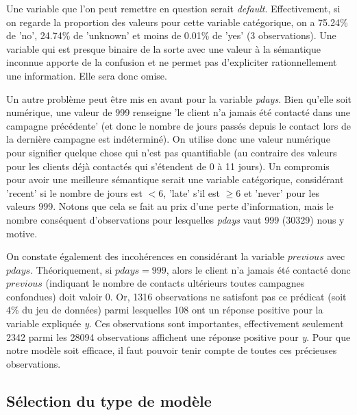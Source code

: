 \documentclass[]{article}
\begin{document}
Une variable que l'on peut remettre en question serait \textit{default}. Effectivement, si on regarde la proportion des valeurs pour cette variable catégorique, on a 75.24\% de 'no', 24.74\% de 'unknown' et moins de 0.01\% de 'yes' (3 observations). Une variable qui est presque binaire de la sorte avec une valeur à la sémantique inconnue apporte de la confusion et ne permet pas d'expliciter rationnellement une information. Elle sera donc omise.\\

\par Un autre problème peut être mis en avant pour la variable \textit{pdays}. Bien qu'elle soit numérique, une valeur de 999 renseigne 'le client n'a jamais été contacté dans une campagne précédente' (et donc le nombre de jours passés depuis le contact lors de la dernière campagne est indéterminé). On utilise donc une valeur numérique pour signifier quelque chose qui n'est pas quantifiable (au contraire des valeurs pour les clients déjà contactés qui s'étendent de 0 à 11 jours). Un compromis pour avoir une meilleure sémantique serait une variable catégorique, considérant 'recent' si le nombre de jours est $<6$, 'late' s'il est $\geq 6$ et 'never' pour les valeurs 999. Notons que cela se fait au prix d'une perte d'information, mais le nombre conséquent d'observations pour lesquelles \textit{pdays} vaut 999 (30329) nous y motive.\\

\par On constate également des incohérences en considérant la variable $previous$ avec $pdays$. Théoriquement, si $pdays=999$, alors le client n'a jamais été contacté donc $previous$ (indiquant le nombre de contacts ultérieurs toutes campagnes confondues) doit valoir 0. Or, 1316 observations ne satisfont pas ce prédicat (soit 4\% du jeu de données) parmi lesquelles 108 ont un réponse positive pour la variable expliquée \textit{y}. Ces observations sont importantes, effectivement seulement 2342 parmi les 28094 observations affichent une réponse positive pour \textit{y}. Pour que notre modèle soit efficace, il faut pouvoir tenir compte de toutes ces précieuses observations.


\subsection{Sélection du type de modèle}
\end{document}
